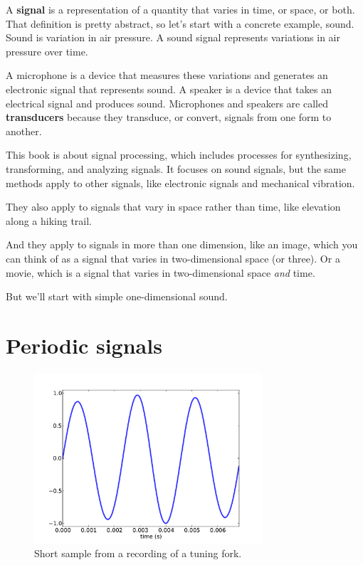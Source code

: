 \documentclass[12pt]{book}
\begin{document}
A {\bf signal} is a representation of a quantity that varies in time,
or space, or both.  That definition is pretty abstract, so let's start
with a concrete example, sound.  Sound is variation in air pressure.
A sound signal represents variations in air pressure over time.

A microphone is a device that measures these variations and generates
an electronic signal that represents sound.  A speaker is a device
that takes an electrical signal and produces sound.
Microphones and speakers are called {\bf transducers} because they
transduce, or convert, signals from one form to another.

This book is about signal processing, which includes processes for
synthesizing, transforming, and analyzing signals.  It focuses on
sound signals, but the same methods apply to other signals, like
electronic signals and mechanical vibration.

They also apply to signals that vary in space rather than time, like
elevation along a hiking trail.

And they apply to signals in more than one dimension, like an
image, which you can think of as a signal that varies in two-dimensional
space (or three).  Or a movie, which is a signal that varies
in two-dimensional space {\it and} time.

But we'll start with simple one-dimensional sound.


\section{Periodic signals}

\begin{figure}
\centerline{\includegraphics[height=2.5in]{figs/tuning1.pdf}}
\caption{Short sample from a recording of a tuning fork.}
\label{fig.tuning1}
\end{figure}
\end{document}
